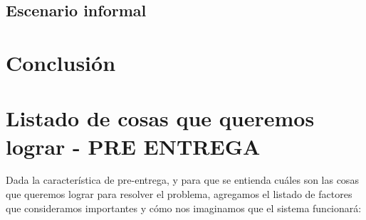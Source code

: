 \documentclass[spanish, 10pt,a4paper]{article}
\numberwithin{equation}{section} %
\begin{document}
\subsection{Escenario informal}

\section{Conclusión}
	\newpage

\newpage
\section{Listado de cosas que queremos lograr - PRE ENTREGA}

Dada la característica de pre-entrega, y para que se entienda cuáles son las cosas que queremos lograr para resolver el problema, agregamos el listado de factores que consideramos importantes y cómo nos imaginamos que el sistema funcionará: 
\end{document}
